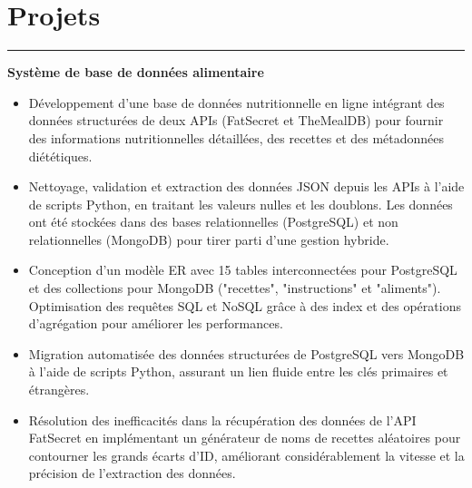 \documentclass[10pt]{article}
\begin{document}
\section*{Projets}
\vspace{-2mm}
\hrule
\vspace{0mm}

\textbf{Système de base de données alimentaire}
\vspace{-4mm}
\begin{itemize}[left=0.15in, itemsep=0pt, label=--]
    \item Développement d'une base de données nutritionnelle en ligne intégrant des données structurées de deux APIs (FatSecret et TheMealDB) pour fournir des informations nutritionnelles détaillées, des recettes et des métadonnées diététiques.
    \item Nettoyage, validation et extraction des données JSON depuis les APIs à l'aide de scripts Python, en traitant les valeurs nulles et les doublons. Les données ont été stockées dans des bases relationnelles (PostgreSQL) et non relationnelles (MongoDB) pour tirer parti d'une gestion hybride.
    \item Conception d'un modèle ER avec 15 tables interconnectées pour PostgreSQL et des collections pour MongoDB ("recettes", "instructions" et "aliments"). Optimisation des requêtes SQL et NoSQL grâce à des index et des opérations d'agrégation pour améliorer les performances.
    \item Migration automatisée des données structurées de PostgreSQL vers MongoDB à l'aide de scripts Python, assurant un lien fluide entre les clés primaires et étrangères.
    \item Résolution des inefficacités dans la récupération des données de l'API FatSecret en implémentant un générateur de noms de recettes aléatoires pour contourner les grands écarts d'ID, améliorant considérablement la vitesse et la précision de l'extraction des données.
\end{itemize}
\end{document}
